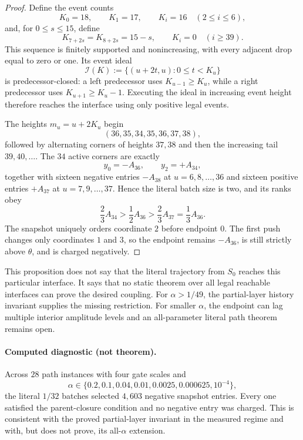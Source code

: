 \begin{proof}
Define the event counts
\begin{equation*}
 K_0=18,
 \qquad K_1=17,
 \qquad K_i=16\quad(2\leq i\leq6),
\end{equation*}
and, for $0\leq s\leq15$, define
\begin{equation*}
 K_{7+2s}=K_{8+2s}=15-s,
 \qquad K_i=0\quad(i\geq39).
\end{equation*}
This sequence is finitely supported and nonincreasing, with every adjacent
drop equal to zero or one.  Its event ideal
\begin{equation*}
 \mathcal I(K):=\{(u+2t,u):0\leq t<K_u\}
\end{equation*}
is predecessor-closed: a left predecessor uses
$K_{u-1}\geq K_u$, while a right predecessor uses
$K_{u+1}\geq K_u-1$.  Executing the ideal in increasing event height
therefore reaches the interface using only positive legal events.

The heights $m_u=u+2K_u$ begin
\begin{equation*}
 (36,35,34,35,36,37,38),
\end{equation*}
followed by alternating corners of heights $37,38$ and then the increasing
tail $39,40,\ldots$.  The $34$ active corners are exactly
\begin{equation*}
 y_0=-A_{36},
 \qquad y_2=+A_{34},
\end{equation*}
together with sixteen negative entries $-A_{38}$ at
$u=6,8,\ldots,36$ and sixteen positive entries $+A_{37}$ at
$u=7,9,\ldots,37$.  Hence the literal batch size is two, and its ranks obey
\begin{equation*}
 \frac23A_{34}>\frac12A_{36}>\frac23A_{37}
 =\frac13A_{36}.
\end{equation*}
The snapshot uniquely orders coordinate $2$ before endpoint $0$.  The first
push changes only coordinates $1$ and $3$, so the endpoint remains
$-A_{36}$, is still strictly above $\theta$, and is charged negatively.
\end{proof}

This proposition does not say that the literal trajectory from $S_0$
reaches this particular interface.  It says that no static theorem over all
legal reachable interfaces can prove the desired coupling.  For
$\alpha>1/49$, the partial-layer history invariant supplies the missing
restriction.  For smaller $\alpha$, the endpoint can lag multiple interior
amplitude levels and an all-parameter literal path theorem remains open.

\paragraph{Computed diagnostic (not theorem).}
Across $28$ path instances with four gate scales and
\begin{equation*}
 \alpha\in\{0.2,0.1,0.04,0.01,0.0025,0.000625,10^{-4}\},
\end{equation*}
the literal $1/32$ batches selected $4{,}603$ negative snapshot entries.
Every one satisfied the parent-closure condition and no negative entry was
charged.  This is consistent with the proved partial-layer invariant in the
measured regime and with, but does not prove, its all-$\alpha$ extension.

